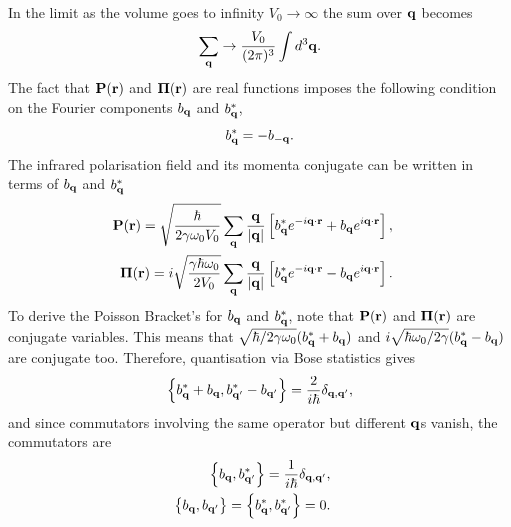 In the limit as the volume goes to infinity $V_0 \to \infty$ the sum over $\vb{q}$ becomes
\begin{equation}
    \sum_{\vb{q}} \rightarrow \frac{V_0}{(2\pi)^3} \int d^3 \vb{q}.
\label{eqn-2122-7}
\end{equation}
The fact that $\vb{P}(\vb{r})$ and $\vb{\Pi}(\vb{r})$ are real functions imposes the following condition on the Fourier components $b_{\vb{q}}$ and $b^*_{\vb{q}}$,
\begin{equation}
    b^*_{\vb{q}} = -b_{-\vb{q}}.
\label{eqn-2122-8}
\end{equation}
The infrared polarisation field and its momenta conjugate can be written in terms of $b_{\vb{q}}$ and $b^*_{\vb{q}}$ 
\begin{subequations}
\begin{align}
    \begin{split}
        \vb{P}(\vb{r}) &= \sqrt{\frac{\hbar}{2\gamma\omega_0V_0}} \sum_{\vb{q}} \frac{\vb{q}}{\abs{\vb{q}}} \left[b^*_{\vb{q}}e^{-i\vb{q}\cdot\vb{r}} + b_{\vb{q}} e^{i\vb{q}\cdot\vb{r}}\right],
    \end{split}\\
    \begin{split}
        \vb{\Pi}(\vb{r}) &= i\sqrt{\frac{\gamma\hbar\omega_0}{2V_0}} \sum_{\vb{q}} \frac{\vb{q}}{\abs{\vb{q}}} \left[b^*_{\vb{q}}e^{-i\vb{q}\cdot\vb{r}} - b_{\vb{q}} e^{i\vb{q}\cdot\vb{r}}\right].
    \end{split}
\end{align}
\label{eqn-2122-9}
\end{subequations}
To derive the Poisson Bracket's for $b_{\vb{q}}$ and $b_{\vb{q}}^*$, note that $\vb{P}(\vb{r})$ and $\vb{\Pi}(\vb{r})$ are conjugate variables. This means that $\sqrt{\hbar / 2\gamma \omega_0} (b_{\vb{q}}^* + b_{\vb{q}})$ and  $i\sqrt{\hbar \omega_0 / 2\gamma} (b_{\vb{q}}^* - b_{\vb{q}})$ are conjugate too. Therefore, quantisation via Bose statistics gives
\begin{equation}
    \left\{b_{\vb{q}}^* + b_{\vb{q}}, b_{\vb{q}'}^* - b_{\vb{q}'}\right\} = \frac{2}{i\hbar} \delta_{\vb{q}, \vb{q}'},
\label{eqn-2122-10}
\end{equation}
and since commutators involving the same operator but different $\vb{q}$s vanish, the commutators are
\begin{subequations}
\begin{align}
    \begin{split}
        \left\{b_{\vb{q}},b^*_{\vb{q}'}\right\} &= \frac{1}{i\hbar} \delta_{\vb{q}, \vb{q}'},
    \end{split}\\
    \begin{split}
        \left\{b_{\vb{q}},b_{\vb{q}'}\right\} &= \left\{b^*_{\vb{q}},b^*_{\vb{q}'}\right\} = 0.
    \end{split}
\end{align}
\label{eqn-2122-11}
\end{subequations}  
